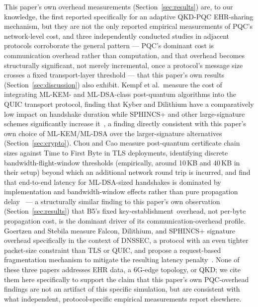 \documentclass[journal]{IEEEtran}
\newcommand{\keyest}{key-establishment}
\begin{document}
This paper's own overhead measurements (Section~\ref{sec:results}) are, to our knowledge, the first reported specifically for an adaptive QKD-PQC EHR-sharing mechanism, but they are not the only reported empirical measurements of PQC's network-level cost, and three independently conducted studies in adjacent protocols corroborate the general pattern --- PQC's dominant cost is communication overhead rather than computation, and that overhead becomes structurally significant, not merely incremental, once a protocol's message size crosses a fixed transport-layer threshold --- that this paper's own results (Section~\ref{sec:discussion}) also exhibit. Kempf et al.\ measure the cost of integrating ML-KEM- and ML-DSA-class post-quantum algorithms into the QUIC transport protocol, finding that Kyber and Dilithium have a comparatively low impact on handshake duration while SPHINCS+ and other large-signature schemes significantly increase it~\cite{kempf2024quicpqc}, a finding directly consistent with this paper's own choice of ML-KEM/ML-DSA over the larger-signature alternatives (Section~\ref{sec:crypto}). Chou and Cao measure post-quantum certificate chain sizes against Time to First Byte in TLS deployments, identifying discrete bandwidth-flight-window thresholds (empirically, around 10\,KB and 40\,KB in their setup) beyond which an additional network round trip is incurred, and find that end-to-end latency for ML-DSA-sized handshakes is dominated by implementation and bandwidth-window effects rather than pure propagation delay~\cite{chou2026certchain} --- a structurally similar finding to this paper's own observation (Section~\ref{sec:results}) that B5's fixed \keyest\ overhead, not per-byte propagation cost, is the dominant driver of its communication-overhead profile. Goertzen and Stebila measure Falcon, Dilithium, and SPHINCS+ signature overhead specifically in the context of DNSSEC, a protocol with an even tighter packet-size constraint than TLS or QUIC, and propose a request-based fragmentation mechanism to mitigate the resulting latency penalty~\cite{goertzen2022dnssec}. None of these three papers addresses EHR data, a 6G-edge topology, or QKD; we cite them here specifically to support the claim that this paper's own PQC-overhead findings are not an artifact of this specific simulation, but are consistent with what independent, protocol-specific empirical measurements report elsewhere.
\end{document}

